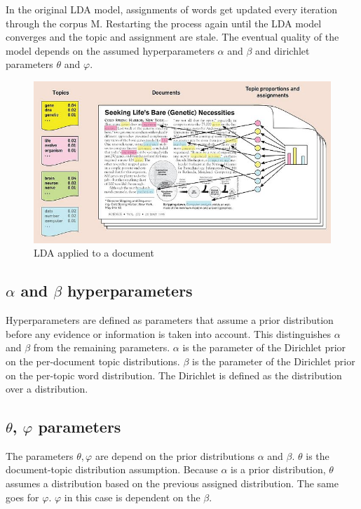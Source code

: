 In the original LDA model, assignments of words get updated every iteration through the corpus M. Restarting the process again until the LDA model converges and the topic and assignment are stale. The eventual quality of the model depends on the assumed hyperparameters $\alpha$ and $\beta$ and dirichlet parameters $\theta$ and $\varphi$. 

\begin{figure}
    \centering
    \includegraphics[scale=0.6]{methodology/700px-Illustrating_LDA.jpg}
    \caption{LDA applied to a document}
    \label{fig:LDA_example}
\end{figure}

\subsection{$\alpha$ and $\beta$ hyperparameters} 
Hyperparameters are defined as parameters that assume a prior distribution before any evidence or information is taken into account. This distinguishes $\alpha$ and $\beta$ from the remaining parameters. $\alpha$ is the parameter of the Dirichlet prior on the per-document topic distributions. $\beta$ is the parameter of the Dirichlet prior on the per-topic word distribution. The Dirichlet is defined as the distribution over a distribution.

\subsection{$\theta$, $\varphi$ parameters}
The parameters $\theta, \varphi$ are depend on the prior distributions $\alpha$ and $\beta$. $\theta$ is the document-topic distribution assumption. Because $\alpha$ is a prior distribution, $\theta$ assumes a distribution based on the previous assigned distribution. The same goes for $\varphi$. $\varphi$ in this case is dependent on the $\beta$. 

